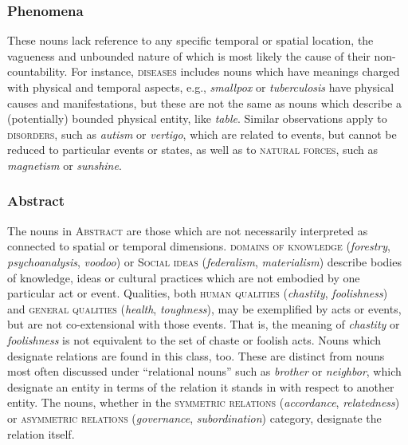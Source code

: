 \documentclass[output=paper]{langscibook}
\begin{document}
\subsubsection{Phenomena} These nouns lack reference to any specific temporal or spatial location, the vagueness and unbounded nature of which is most likely the cause of their non-countability. For instance, \textsc{diseases} includes nouns which have meanings charged with  physical and temporal aspects, e.g., \textit{smallpox} or \textit{tuberculosis} have physical causes and manifestations, but these are not the same as nouns which describe a (potentially) bounded physical entity, like \textit{table}.   Similar observations apply to  \textsc{disorders}, such as \textit{autism} or \textit{vertigo}, which are related to events, but cannot be reduced to particular events or states, as well as to \textsc{natural forces}, such as \textit{magnetism} or \textit{sunshine}.  









\subsubsection{Abstract} The nouns in \textsc{Abstract} are those which are not necessarily interpreted as connected to spatial or temporal dimensions.  \textsc{domains of knowledge} (\textit{forestry}, \textit{psychoanalysis}, \textit{voodoo}) or \textsc{Social ideas}  (\textit{federalism}, \textit{materialism}) describe bodies of knowledge, ideas or cultural practices which are not embodied by one particular act or event.  Qualities, both \textsc{human qualities} (\textit{chastity}, \textit{foolishness}) and \textsc{general qualities} (\textit{health}, \textit{toughness}), may be exemplified by acts or events, but are not co-extensional with those events.  That is, the meaning of \textit{chastity} or \textit{foolishness} is not equivalent to the set of chaste or foolish acts.  Nouns which designate relations are found in this class, too.  These are distinct from nouns most often discussed under ``relational nouns'' such as \textit{brother} or \textit{neighbor}, which designate an entity in terms of the relation it stands in with respect to another entity.  The nouns, whether in the \textsc{symmetric relations} (\textit{accordance}, \textit{relatedness}) or \textsc{asymmetric relations} (\textit{governance}, \textit{subordination}) category, designate the relation itself.  
\end{document}
